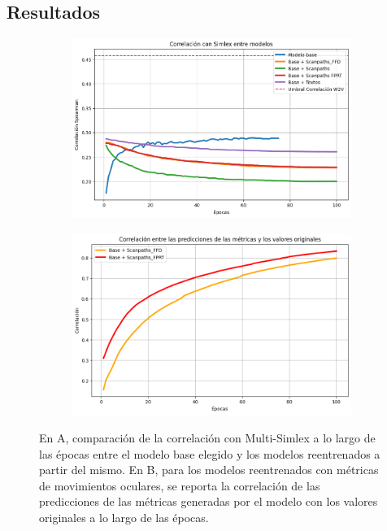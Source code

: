 \subsection{Resultados}

\begin{figure}[H]
    \centering
    \begin{subfigure}[b]{0.8\textwidth}
        \centering
        \includegraphics[width=1\textwidth]{imagenes/corr_reentrenamiento.png}
        \caption{}
        \label{fig:corr_reentrenamiento.png}
    \end{subfigure}
    \hfill
    \begin{subfigure}[b]{0.8\textwidth}
        \centering
        \includegraphics[width=1\textwidth]{imagenes/corr_pred_reentrenamiento.png}
        \caption{}
        \label{fig:corr_pred_reentrenamiento.png}
    \end{subfigure}
    \caption{En A, comparación de la correlación con Multi-Simlex a lo largo de las 
    épocas entre el modelo base elegido y los modelos reentrenados a partir del 
    mismo. En B, para los modelos reentrenados con métricas de movimientos 
    oculares, se reporta la correlación de las predicciones de las métricas 
    generadas por el modelo con los valores originales a lo largo de las épocas.}
    \label{fig:simlex_reentrenamiento}
\end{figure}

